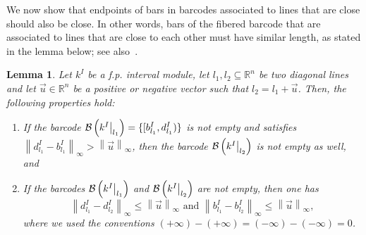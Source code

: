 \documentclass{article}
\newcommand{\field}{k}
\newcommand{\norm}[1]{\left\lVert #1 \right\rVert}
\newcommand{\barcode}[1]{ {\mathcal B}\left(#1\right) }
\newcommand{\R}{\mathbb{R}}
\newcommand\restr[2]{{  \left.\kern-\nulldelimiterspace #1 \vphantom{\big|} \right|_{#2}  }}
\DeclareRobustCommand*{\ora}{\overrightarrow}
\newtheorem{lemma}[theorem]{Lemma}
\newcommand{\rebuttal}[1]{{ #1}}
\begin{document}
We now show that endpoints of bars in barcodes associated to lines that are close should also be close.
In other words, bars of the fibered barcode that are associated to lines that are close to each other
must have similar length,
as stated in the lemma below; see also~\cite[Lemma 2]{landiRankInvariantStability2018}. \\

\begin{lemma}\label{lemma:compatible_close}
	Let $\rebuttal{k^I}$ be a \rebuttal{f.p.} interval module, let $l_1,l_2\subseteq\R^n$ be two diagonal lines and
	let $\ora u\in \R^n$ be a positive or negative vector
	such that $l_2 = l_1 + \ora u$.
	Then, the following properties hold:
	\begin{enumerate}[label=\textnormal{(\textit{\roman*})}]
		\item If the barcode
			$\barcode{\restr{\rebuttal{\field^I}}{l_1}}=\{[b^I_{l_1}, d^I_{l_1})\}$
			is not empty and satisfies $\norm{d^I_{l_1} - b^I_{l_1}}_\infty >
			\norm{\ora u}_\infty$, then the barcode
			$\barcode{\restr{\rebuttal{\field^I}}{l_2}}$ is not empty as well, and
		\item	If the barcodes $\barcode{\restr{\rebuttal{\field^I}}{l_1}}$ and
			$\barcode{\restr{\rebuttal{\field^I}}{l_2}}$ are not empty,
			then one has
			\begin{equation*}
				\norm{ d^I_{l_1}-d^I_{l_2}}_{\infty} \le \norm{ \ora u}_\infty \text{ and } \norm{ b^I_{l_1}-b^I_{l_2}}_\infty \le \norm{ \ora u}_\infty,
			\end{equation*}
			where we used the conventions
			$(+\boldsymbol\infty) - (+\boldsymbol\infty) = (-\boldsymbol\infty) - (-\boldsymbol\infty)  = 0 $.
	\end{enumerate}
\end{lemma}
\end{document}
